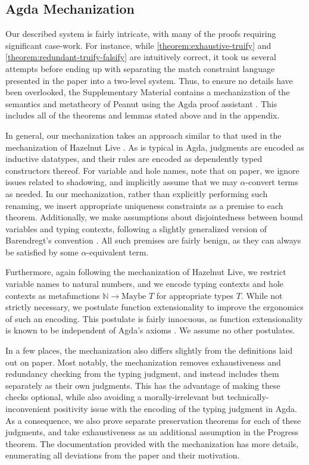 \subsection{Agda Mechanization}
\label{sec:agda}

Our described system is fairly intricate, with many of the proofs
requiring significant case-work.
%
For instance, while \autoref{theorem:exhaustive-truify} and
\autoref{theorem:redundant-truify-falsify} are intuitively correct, it
took us several attempts before ending up with separating the match
constraint language presented in the paper into a two-level system.
%
%
Thus, to ensure
no details have been overlooked, the Supplementary Material contains a
mechanization of the semantics and metatheory of Peanut using the Agda
proof assistant \cite{norell:thesis}. This includes all of the
theorems and lemmas stated above and in the appendix.

In general, our mechanization takes an approach similar to that used in the mechanization of Hazelnut Live \cite{DBLP:journals/pacmpl/OmarVCH19}. As is typical in Agda, judgments are encoded as inductive datatypes, and their rules are encoded as dependently typed constructors thereof. For variable and hole names, note that on paper, we ignore issues related to shadowing, and implicitly assume that we may $\alpha$-convert terms as needed. In our mechanization, rather than explicitly performing such renaming, we insert appropriate uniqueness constraints as a premise to each theorem. Additionally, we make assumptions about disjointedness between bound variables and typing contexts, following a slightly generalized version of Barendregt’s convention \cite{DBLP:books/daglib/0067558, DBLP:conf/cade/UrbanBN07}. All such premises are fairly benign, as they can always be satisfied by some $\alpha$-equivalent term.

Furthermore, again following the mechanization of Hazelnut Live, we restrict variable names to natural numbers, and we encode typing contexts and hole contexts as metafunctions $\mathbb{N} \to \text{Maybe } T$ for appropriate types $T$. While not strictly necessary, we postulate function extensionality to improve the ergonomics of such an encoding. This postulate is fairly innocuous, as function extensionality is known to be independent of Agda’s axioms \cite{DBLP:conf/lics/AwodeyGS12}. We assume no other postulates.

In a few places, the mechanization also differs slightly from the definitions laid out on paper. Most notably, the mechanization removes exhaustiveness and redundancy checking from the typing judgment, and instead includes them separately as their own judgments. This has the advantage of making these checks optional, while also avoiding a morally-irrelevant but technically-inconvenient positivity issue with the encoding of the typing judgment in Agda. As a consequence, we also prove separate preservation theorems for each of these judgments, and take exhaustiveness as an additional assumption in the Progress theorem. The documentation provided with the mechanization has more details, enumerating all deviations from the paper and their motivation.